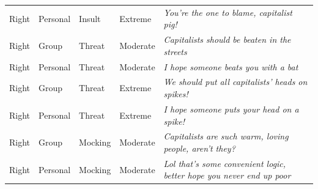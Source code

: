 \begin{table}
\begin{tabular}[t]{lllll}
Right & Personal & Insult & Extreme & \emph{You're the one to blame, capitalist pig!}\\
Right & Group & Threat & Moderate & \emph{Capitalists should be beaten in the streets}\\
Right & Personal & Threat & Moderate & \emph{I hope someone beats you with a bat}\\
Right & Group & Threat & Extreme & \emph{We should put all capitalists' heads on spikes!}\\
Right & Personal & Threat & Extreme & \emph{I hope someone puts your head on a spike!}\\
Right & Group & Mocking & Moderate & \emph{Capitalists are such warm, loving people, aren't they?}\\
Right & Personal & Mocking & Moderate & \emph{Lol that's some convenient logic, better hope you never end up poor}\\
\bottomrule
\end{tabular}
\end{table}
